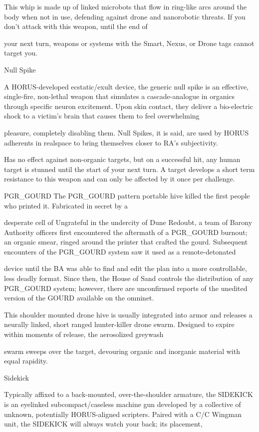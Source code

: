 This whip is made up of linked microbots that flow in ring-like arcs around the body when not in use,
defending against drone and nanorobotic threats. If you don’t attack with this weapon, until the end of

your next turn, weapons or systems with the Smart, Nexus, or Drone tags cannot target you.


Null Spike

A HORUS-developed ecstatic/exult device, the generic null spike is an effective, single-fire, non-lethal
weapon that simulates a cascade-analogue in organics through specific neuron excitement. Upon skin
contact, they deliver a bio-electric shock to a victim’s brain that causes them to feel overwhelming

pleasure, completely disabling them. Null Spikes, it is said, are used by HORUS adherents in realspace to
bring themselves closer to RA’s subjectivity.





Has no effect against non-organic targets, but on a successful hit, any human target is stunned until the
start of your next turn. A target develops a short term resistance to this weapon and can only be affected
by it once per challenge.


PGR\_GOURD
The PGR\_GOURD pattern portable hive killed the first people who printed it. Fabricated in secret by a

desperate cell of Ungrateful in the undercity of Dune Redoubt, a team of Barony Authority officers first
encountered the aftermath of a PGR\_GOURD burnout; an organic smear, ringed around the printer that
crafted the gourd. Subsequent encounters of the PGR\_GOURD system saw it used as a remote-detonated

device until the BA was able to find and edit the plan into a more controllable, less deadly format. Since
then, the House of Sand controls the distribution of any PGR\_GOURD system; however, there are
unconfirmed reports of the unedited version of the GOURD available on the omninet.

This shoulder mounted drone hive is usually integrated into armor and releases a neurally linked, short
ranged hunter-killer drone swarm. Designed to expire within moments of release, the aerosolized greywash

swarm sweeps over the target, devouring organic and inorganic material with equal rapidity.


Sidekick

Typically affixed to a back-mounted, over-the-shoulder armature, the SIDEKICK is an eyelinked
subcompact/caseless machine gun developed by a collective of unknown, potentially HORUS-aligned
scripters. Paired with a C/C Wingman unit, the SIDEKICK will always watch your back; its placement,

